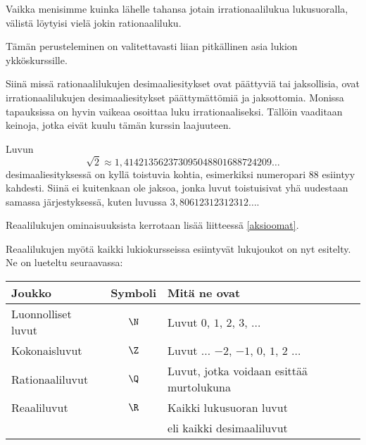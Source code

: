 Vaikka menisimme kuinka lähelle tahansa jotain irrationaalilukua lukusuoralla, välistä löytyisi vielä jokin rationaaliluku.



Tämän perusteleminen on valitettavasti liian pitkällinen asia lukion ykköskurssille.

Siinä missä rationaalilukujen desimaaliesitykset ovat päättyviä tai jaksollisia, ovat irrationaalilukujen desimaaliesitykset päättymättömiä ja
jaksottomia. Monissa tapauksissa on hyvin vaikeaa osoittaa luku irrationaaliseksi. Tällöin vaaditaan keinoja, jotka eivät kuulu tämän kurssin laajuuteen.

Luvun
\[\sqrt{2} \approx 1,414213562373095048801688724209\ldots\]
desimaaliesityksessä on kyllä toistuvia kohtia, esimerkiksi numeropari $88$ esiintyy kahdesti. Siinä ei kuitenkaan ole jaksoa, jonka luvut toistuisivat yhä uudestaan
samassa järjestyksessä, kuten luvussa $3,80612312312312\ldots$.

Reaalilukujen ominaisuuksista kerrotaan lisää liitteessä \ref{aksioomat}.


Reaalilukujen myötä kaikki lukiokursseissa esiintyvät lukujoukot on nyt esitelty. Ne on lueteltu seuraavassa:
\begin{center}\begin{tabular}{l|c|l}
Joukko & Symboli & Mitä ne ovat\\
\hline
Luonnolliset luvut & $\N$ &
Luvut $0$, $1$, $2$, $3$, $\ldots$ \\
Kokonaisluvut & $\Z$ & Luvut $\ldots$ $-2$, $-1$, $0$, $1$, $2$ $\ldots$ \\ 
Rationaaliluvut & $\Q$ & Luvut, jotka voidaan esittää
murtolukuna \\
Reaaliluvut & $\R$ & Kaikki lukusuoran luvut \\
& & eli kaikki desimaaliluvut
\end{tabular} \end{center} 

